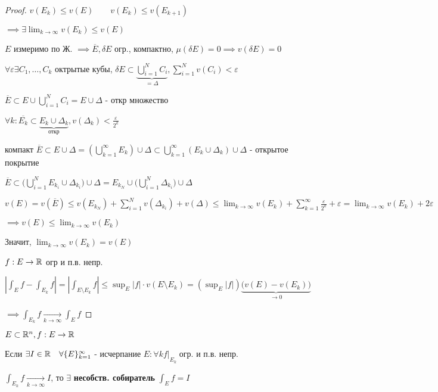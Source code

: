     \begin{proof}
        $v(E_k) \le v(E)\qquad v(E_k) \le v(E_{k+1})$

        $\implies \exists \lim_{k\to\infty} v(E_k) \le v(E)$

        $E$ измеримо по Ж. $\implies \overline{E}, \delta E$ огр., компактно, 
        $\mu(\delta E) = 0 \implies v(\delta E) = 0$

        $\forall \varepsilon \exists C_1, \dotsc, C_k$  октрытые кубы, 
        $\delta E \subset \underbrace{\bigcup^N_{i=1}C_i}_{=\Delta}, \sum^N_{i=1}v(C_i) < \varepsilon$

        $\overline{E} \subset E \cup \bigcup^N_{i=1}C_i = E \cup \Delta$ - откр множество

        $\forall k: \overline{E_k} \subset \underbrace{E_k \cup \Delta_k}_{\text{откр}},  v(\Delta_k) < \frac{\varepsilon}{2^k}$

        компакт $\overline{E} \subset E \cup \Delta = (\bigcup^\infty_{k=1}E_k)\cup \Delta \subset \bigcup^\infty_{k=1}(E_k \cup \Delta_k)\cup \Delta$ - открытое покрытие

        $\overline{E} \subset \big(\bigcup^N_{i=1}E_{k_i}\cup \Delta_{k_i}\big) \cup \Delta = 
        E_{k_N}\cup \big(\bigcup^N_{i=1}\Delta_{k_i}\big)\cup \Delta$

        $\displaystyle v(E) = v(\overline{E}) \le v(E_{k_N}) + \sum^N_{i=1}v(\Delta_{k_i}) + v(\Delta) \le
        \lim_{k\to\infty} v(E_k) + \sum^\infty_{k=1}\frac{\varepsilon}{2^k} + \varepsilon = 
        \lim_{k\to\infty} v(E_k) + 2\varepsilon$

        $\implies v(E) \le \lim_{k \to \infty} v(E_k)$

        Значит, $\lim_{k\to\infty}v(E_k) = v(E)$

        $f: E \to \mathbb{R}$ огр и п.в. непр.

        $| \int_E f - \int_{E_k} f | = | \int_{E\setminus E_k} f | \le 
        \sup_E |f| \cdot v(E\setminus E_k) = (\sup_E |f |) \underbrace{\big(v(E) - v(E_k)\big)}_{\to 0}$

        $\implies \int_{E_k} f \underset{k\to\infty}{\to} \int_E f$
    \end{proof}

    \begin{definition}
        $E \subset \mathbb{R}^n, f: E \to \mathbb{R}$

        Если $\exists I \in \mathbb{R} \quad \forall \{ E \}^\infty_{k=1}$ - исчерпание $E: \forall k f|\underset{E_k}{ }$ огр. и п.в. непр.

        $\int_{E_k} f \underset{k\to\infty}{\to} I$, то $\exists$ \textbf{несобств. собиратель} $\int_E f = I$
    \end{definition}

